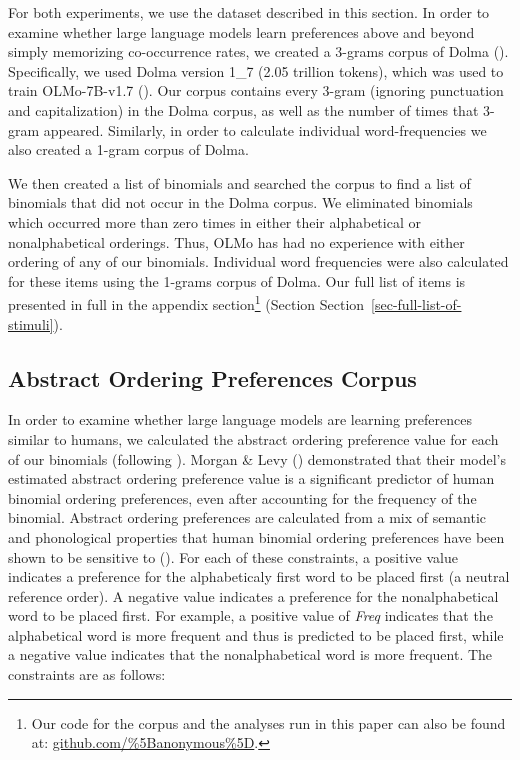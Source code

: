 \documentclass[
  nottoc]{article}
\begin{document}
For both experiments, we use the dataset described in this section. In
order to examine whether large language models learn preferences above
and beyond simply memorizing co-occurrence rates, we created a 3-grams
corpus of Dolma (). Specifically, we used Dolma version 1\_7 (2.05 trillion
tokens), which was used to train OLMo-7B-v1.7
(). Our corpus contains every 3-gram (ignoring punctuation and
capitalization) in the Dolma corpus, as well as the number of times that
3-gram appeared. Similarly, in order to calculate individual
word-frequencies we also created a 1-gram corpus of Dolma.

We then created a list of binomials and searched the corpus to find a
list of binomials that did not occur in the Dolma corpus. We eliminated
binomials which occurred more than zero times in either their
alphabetical or nonalphabetical orderings. Thus, OLMo has had no
experience with either ordering of any of our binomials. Individual word
frequencies were also calculated for these items using the 1-grams
corpus of Dolma. Our full list of items is presented in full in the
appendix section\footnote{Our code for the corpus and the analyses run
  in this paper can also be found at:
  \url{github.com/\%5Banonymous\%5D}.} (Section
Section~\ref{sec-full-list-of-stimuli}).

\subsection{Abstract Ordering Preferences
Corpus}\label{abstract-ordering-preferences-corpus}

In order to examine whether large language models are learning
preferences similar to humans, we calculated the abstract ordering
preference value for each of our binomials (following
).
Morgan \& Levy ()
demonstrated that their model's estimated abstract ordering preference
value is a significant predictor of human binomial ordering preferences,
even after accounting for the frequency of the binomial. Abstract
ordering preferences are calculated from a mix of semantic and
phonological properties that human binomial ordering preferences have
been shown to be sensitive to
().
For each of these constraints, a positive value indicates a preference
for the alphabeticaly first word to be placed first (a neutral reference
order). A negative value indicates a preference for the nonalphabetical
word to be placed first. For example, a positive value of \emph{Freq}
indicates that the alphabetical word is more frequent and thus is
predicted to be placed first, while a negative value indicates that the
nonalphabetical word is more frequent. The constraints are as follows:
\end{document}
